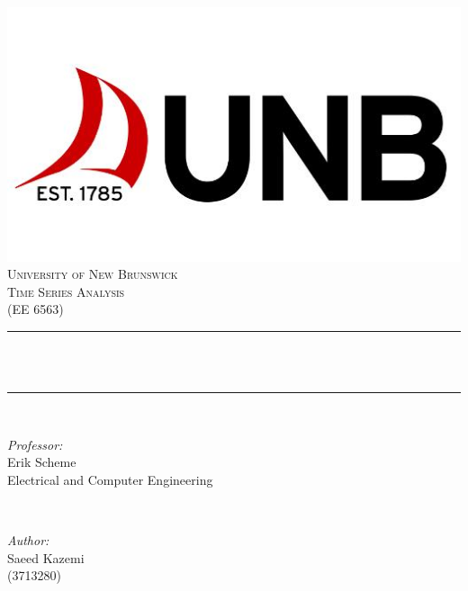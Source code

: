 \documentclass[12pt]{article}
\begin{document}


\begin{titlepage}
	\centering
    \vspace*{0.4 cm}
    \includegraphics[scale = 0.5]{figures/unb.jpg}\\[1.0 cm]	%
    \textsc{\LARGE \newline\newline University of New Brunswick}\\[1.8 cm]	%
	\textsc{\Large Time Series Analysis\\(EE 6563)}\\[0.5 cm]				%
	\rule{\linewidth}{0.2 mm} \\[0.4 cm]
	{ \huge \bfseries \thetitle}\\
	\rule{\linewidth}{0.2 mm} \\[1.5 cm]
	
	\begin{minipage}{0.5\textwidth}
		\begin{flushleft} \large
			\emph{Professor:}\\
			Erik Scheme\\
            Electrical and Computer Engineering\\
			\end{flushleft}
			\end{minipage}~
			\begin{minipage}{0.5\textwidth}
            
			\begin{flushright} \large
			\emph{Author:} \\
			Saeed Kazemi\\ (3713280)\\

		\end{flushright}
        
	\end{minipage}\\[1 cm]
	
	
    \thedate
    
    
    
	
\end{titlepage}
\end{document}
